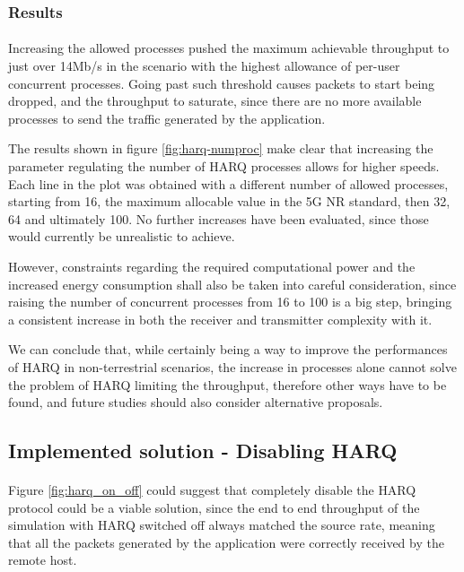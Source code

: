 \subsubsection{Results}
\paragraph{}
Increasing the allowed processes pushed the maximum achievable throughput to just over 14Mb/s in the scenario with the highest allowance of per-user concurrent processes. Going past such threshold causes packets to start being dropped, and the throughput to saturate, since there are no more available processes to send the traffic generated by the application.

The results shown in figure \ref{fig:harq-numproc} make clear that increasing the parameter regulating the number of \ac{HARQ} processes allows for higher speeds. Each line in the plot was obtained with a different number of allowed processes, starting from 16, the maximum allocable value in the 5G \ac{NR} standard, then 32, 64 and ultimately 100. No further increases have been evaluated, since those would currently be unrealistic to achieve.

However, constraints regarding the required computational power and the increased energy consumption shall also be taken into careful consideration, since raising the number of concurrent processes from 16 to 100 is a big step, bringing a consistent increase in both the receiver and transmitter complexity with it.

We can conclude that, while certainly being a way to improve the performances of \ac{HARQ} in non-terrestrial scenarios, the increase in processes alone cannot solve the problem of \ac{HARQ} limiting the throughput, therefore other ways have to be found, and future studies should also consider alternative proposals.

\subsection{Implemented solution - Disabling HARQ}
\paragraph{}
Figure \ref{fig:harq_on_off} could suggest that completely disable the \ac{HARQ} protocol could be a viable solution, since the end to end throughput of the simulation with \ac{HARQ} switched off always matched the source rate, meaning that all the packets generated by the application were correctly received by the remote host.


